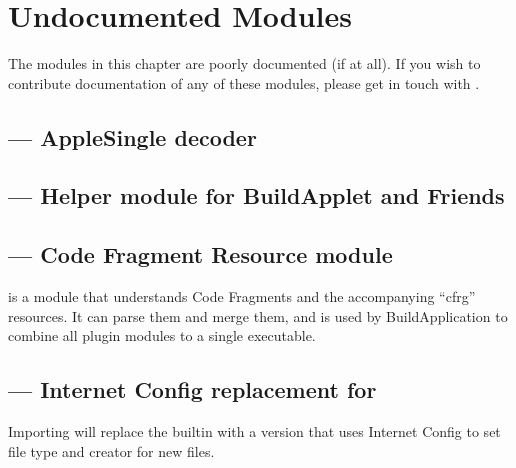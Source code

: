 \chapter{Undocumented Modules \label{undocumented-modules}}


The modules in this chapter are poorly documented (if at all).  If you
wish to contribute documentation of any of these modules, please get in
touch with
.

\localmoduletable


\section{ --- AppleSingle decoder}


\section{ --- Helper module for BuildApplet and Friends}


\section{ --- Code Fragment Resource module}

 is a module that understands Code Fragments and the
accompanying ``cfrg'' resources. It can parse them and merge them, and is
used by BuildApplication to combine all plugin modules to a single
executable.


\section{ --- Internet Config replacement for }

Importing  will replace the builtin 
with a version that uses Internet Config to set file type and creator
for new files.


